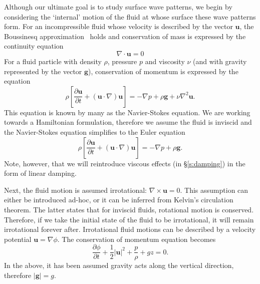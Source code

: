 Although our ultimate goal is to study surface wave patterns, we begin by considering the `internal' motion of the fluid at whose surface these wave patterns form. For an incompressible fluid whose velocity is described by the vector $\boldsymbol{u}$, the Boussinesq approximation~\citep{kundu02:_fluid_mechan} holds and conservation of mass is expressed by the continuity equation
\begin{equation}
\nabla \cdot \boldsymbol{u}= 0 \label{e:Cons Mass}
\end{equation}
For a fluid particle with density $\rho$, pressure $p$ and viscosity $\nu$ (and with gravity represented by the vector $\boldsymbol{g}$), conservation of momentum is expressed by the equation
\begin{equation}
\rho \left[ \frac{\partial \boldsymbol{u}}{\partial t} + (\boldsymbol{u} \cdot \nabla )\boldsymbol{u} \right] = - \nabla p + \rho \boldsymbol{g}+ \nu \nabla^2 \boldsymbol{u}. 
\end{equation}
This equation is known by many as the Navier-Stokes equation. We are working towards a Hamiltonian formulation, therefore we assume the fluid is inviscid and the Navier-Stokes equation simplifies to the Euler equation
\begin{equation}
\rho \left[ \frac{\partial \boldsymbol{u}}{\partial t} + (\boldsymbol{u} \cdot \nabla )\boldsymbol{u} \right] = - \nabla p + \rho \boldsymbol{g}.
\end{equation}
Note, however, that we will reintroduce viscous effects (in \S\ref{s:damping}) in the form of linear damping.

Next, the fluid motion is assumed irrotational: $\nabla \times \boldsymbol{u}= 0$. This assumption can either be introduced ad-hoc, or it can be inferred from Kelvin's circulation theorem. The latter states that for inviscid fluids, rotational motion is conserved. Therefore, if we take the initial state of the fluid to be irrotational, it will remain irrotational forever after. Irrotational fluid motions can be described by a velocity potential $\boldsymbol{u}= \nabla \phi$. The conservation of momentum equation becomes
\begin{equation}
\frac{\partial \phi}{\partial t} + \frac12 |\boldsymbol{u}|^2 + \frac{p}{\rho} + g z = 0.
\end{equation}
In the above, it has been assumed gravity acts along the vertical direction, therefore $|\boldsymbol{g}|=g$.

